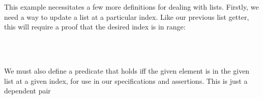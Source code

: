 \documentclass[sigplan,review]{acmart}\settopmatter{printfolios=true,printccs=false,printacmref=false}
\begin{document}
This example necessitates a few more definitions for dealing with lists. Firstly, we need 
a way to update a list at a particular index. Like our previous list getter, this will require 
a proof that the desired index is in range:

\begin{code}
\>[2]\AgdaSpace{}%
\AgdaSymbol{:}\AgdaSpace{}%
\AgdaSymbol{(}\AgdaSpace{}%
\AgdaSymbol{:}\AgdaSpace{}%
\AgdaSpace{}%
\AgdaSymbol{)\{}\AgdaSpace{}%
\AgdaSymbol{:}\AgdaSpace{}%
\AgdaSymbol{\}}\AgdaSpace{}%
\AgdaSpace{}%
\AgdaSpace{}%
\AgdaOperator{\AgdaFunction{<}}\AgdaSpace{}%
\AgdaSpace{}%
\AgdaSpace{}%
\AgdaSpace{}%
\AgdaSpace{}%
\AgdaSpace{}%
\AgdaSpace{}%
\<%
\\
%
\>[2]\AgdaSpace{}%
\AgdaSymbol{(}\AgdaSpace{}%
\AgdaSpace{}%
\AgdaSymbol{)}\AgdaSpace{}%
\AgdaSymbol{\{}\AgdaSymbol{\}}\AgdaSpace{}%
\AgdaSpace{}%
\AgdaSpace{}%
\AgdaSymbol{=}\AgdaSpace{}%
\AgdaSpace{}%
\AgdaSpace{}%
\<%
\\
%
\>[2]\AgdaSpace{}%
\AgdaSymbol{(}\AgdaSpace{}%
\AgdaSpace{}%
\AgdaSymbol{)}\AgdaSpace{}%
\AgdaSymbol{\{}\AgdaSpace{}%
\AgdaSymbol{\}}\AgdaSpace{}%
\AgdaSymbol{(}\AgdaSpace{}%
\AgdaSymbol{)}\AgdaSpace{}%
\AgdaSpace{}%
\AgdaSymbol{=}\AgdaSpace{}%
\AgdaSpace{}%
\AgdaSpace{}%
\AgdaSymbol{(}\AgdaSpace{}%
\AgdaOperator{\AgdaFunction{[}}\AgdaSpace{}%
\AgdaSpace{}%
\AgdaOperator{\AgdaFunction{]≔}}\AgdaSpace{}%
\AgdaSymbol{)}\<%
\end{code}
We must also define a predicate that holds iff the given element 
is in the given list at a given index, for use in our 
specifications and assertions. This is just a dependent pair 
\end{document}

